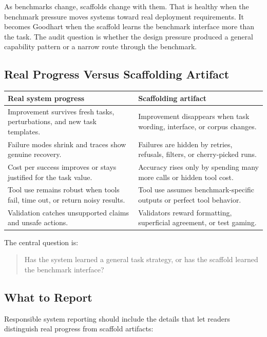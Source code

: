 As benchmarks change, scaffolds change with them. That is healthy when the benchmark pressure moves systems toward real deployment requirements. It becomes Goodhart when the scaffold learns the benchmark interface more than the task. The audit question is whether the design pressure produced a general capability pattern or a narrow route through the benchmark.

\subsection{Real Progress Versus Scaffolding Artifact}

\begin{center}
\begin{tabularx}{\textwidth}{@{}XX@{}}
\toprule
\textbf{Real system progress} & \textbf{Scaffolding artifact} \\
\midrule
Improvement survives fresh tasks, perturbations, and new task templates. & Improvement disappears when task wording, interface, or corpus changes. \\
Failure modes shrink and traces show genuine recovery. & Failures are hidden by retries, refusals, filters, or cherry-picked runs. \\
Cost per success improves or stays justified for the task value. & Accuracy rises only by spending many more calls or hidden tool cost. \\
Tool use remains robust when tools fail, time out, or return noisy results. & Tool use assumes benchmark-specific outputs or perfect tool behavior. \\
Validation catches unsupported claims and unsafe actions. & Validators reward formatting, superficial agreement, or test gaming. \\
\bottomrule
\end{tabularx}
\end{center}

The central question is:

\begin{quote}
Has the system learned a general task strategy, or has the scaffold learned the benchmark interface?
\end{quote}

\subsection{What to Report}

Responsible system reporting should include the details that let readers distinguish real progress from scaffold artifacts:

